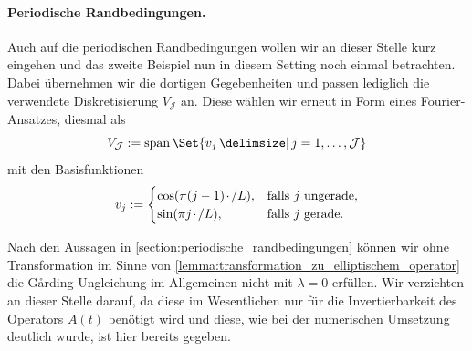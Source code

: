 \documentclass[../main.tex]{subfiles}
\begin{document}
\paragraph{Periodische Randbedingungen.} %
\label{par:periodische_randbedingungen_}

Auch auf die periodischen Randbedingungen wollen wir an dieser Stelle kurz eingehen und das zweite Beispiel nun in diesem Setting noch einmal betrachten.
Dabei übernehmen wir die dortigen Gegebenheiten und passen lediglich die verwendete Diskretisierung $V_{\mathcal J}$ an.
Diese wählen wir erneut in Form eines Fourier-Ansatzes, diesmal als
\begin{equation}
    V_{\mathcal J} := \spn \Set{ v_{j} \given j = 1, \dots, \mathcal J}
\end{equation}
mit den Basisfunktionen
\begin{equation}
    v_{j} := \begin{cases}
        \cos(\pi (j - 1) {\mkern2mu\cdot\mkern2mu} / L), & \text{falls } j \text{ ungerade},\\
        \sin(\pi j {\mkern2mu\cdot\mkern2mu} / L), & \text{falls } j \text{ gerade}.
    \end{cases}
\end{equation}

Nach den Aussagen in \cref{section:periodische_randbedingungen} können wir ohne Transformation im Sinne von \cref{lemma:transformation_zu_elliptischem_operator} die G\aa{}rding-Ungleichung im Allgemeinen nicht mit $\lambda = 0$ erfüllen.
Wir verzichten an dieser Stelle darauf, da diese im Wesentlichen nur für die Invertierbarkeit des Operators $A(t)$ benötigt wird und diese, wie bei der numerischen Umsetzung deutlich wurde, ist hier bereits gegeben.
\end{document}
